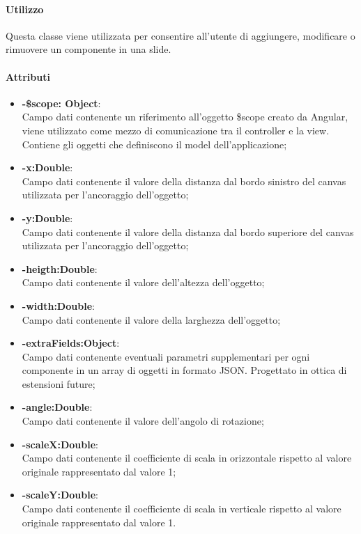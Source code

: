 	\paragraph{Utilizzo}
	Questa classe viene utilizzata per consentire all'utente di aggiungere, modificare o rimuovere un componente in una slide.
	
	\paragraph{Attributi}
	\begin{itemize}
		\item \textbf{-\$scope: Object}:\\
			Campo dati contenente un riferimento all'oggetto \$scope creato da Angular, viene utilizzato come mezzo di comunicazione tra il controller e la view. Contiene gli oggetti che definiscono il model dell'applicazione;
		\item\textbf{-x:Double}:\\
			Campo dati contenente il valore della distanza dal bordo sinistro del canvas utilizzata per l'ancoraggio dell'oggetto;
		\item\textbf{-y:Double}:\\
			Campo dati contenente il valore della distanza dal bordo superiore del canvas utilizzata per l'ancoraggio dell'oggetto;
		\item\textbf{-heigth:Double}:\\
			Campo dati contenente il valore dell'altezza dell'oggetto;
		\item\textbf{-width:Double}:\\
			Campo dati contenente il valore della larghezza dell'oggetto;
		\item\textbf{-extraFields:Object}:\\
			Campo dati contenente eventuali parametri supplementari per ogni componente in un array di oggetti in formato JSON. Progettato in ottica di estensioni future; 
		\item\textbf{-angle:Double}:\\	
			Campo dati contenente il valore dell'angolo di rotazione;
		\item\textbf{-scaleX:Double}:\\
			Campo dati contenente il coefficiente di scala in orizzontale rispetto al valore originale rappresentato dal valore 1;
		\item\textbf{-scaleY:Double}:\\	
			Campo dati contenente il coefficiente di scala in verticale rispetto al valore originale rappresentato dal valore 1.
	
	\end{itemize}
	
